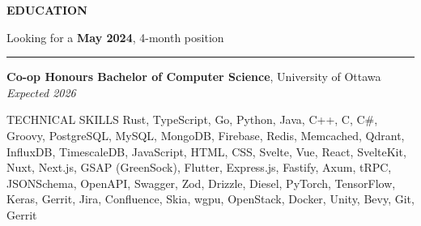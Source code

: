 \documentclass{resume}
\begin{document}
\color{primary}

\vspace{-8pt}

\sectionskip
\MakeUppercase{{\bf Education}}
\vspace{-21pt}
\begin{flushright}
	{Looking for a \textbf{May 2024}, 4-month position}
\end{flushright}
\sectionlineskip
\hrule
\begin{list}{}{
		\setlength{\leftmargin}{0em}
	}
	\item[] \textbf{Co-op Honours Bachelor of Computer Science}, University of Ottawa \hfill \textit{Expected 2026}
\end{list}

\vspace{-6pt}

\begin{rSection}{TECHNICAL SKILLS}
	Rust, TypeScript, Go, Python, Java, C++, C, C\#, Groovy,
	PostgreSQL, MySQL, MongoDB, Firebase, Redis, Memcached,
	Qdrant,
	InfluxDB, TimescaleDB,
	JavaScript, HTML, CSS,
	Svelte, Vue, React, SvelteKit, Nuxt, Next.js,
	GSAP (GreenSock), Flutter,
	Express.js, Fastify, Axum, tRPC,
	JSONSchema, OpenAPI, Swagger, Zod,
	Drizzle, Diesel,
	PyTorch, TensorFlow, Keras,
	Gerrit, Jira, Confluence,
	Skia, wgpu, OpenStack, Docker,
	Unity, Bevy,
	Git, Gerrit
\end{rSection}

\vspace{-8pt}
\end{document}
